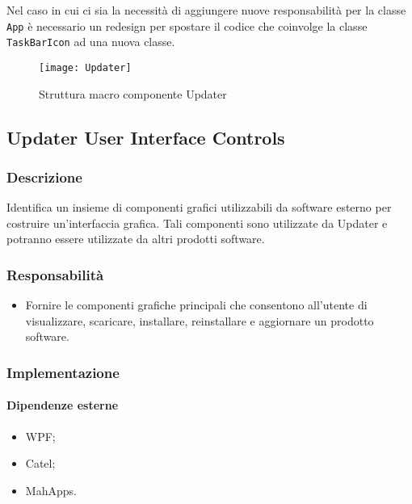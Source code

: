 \documentclass[../RelazioneFinale.tex]{subfiles}
\begin{document}
				Nel caso in cui ci sia la necessità di aggiungere nuove responsabilità per la classe \verb|App| è necessario un redesign per spostare il codice che coinvolge la classe \verb|TaskBarIcon| ad una nuova classe. 		
			\vfill
			\begin{figure}[h]
				\texttt{[image: Updater]}
				\label{fig:Updater}
				\caption{Struttura macro componente Updater}
			\end{figure}
				
\newpage
			
		\subsection{Updater User Interface Controls}

			\subsubsection{Descrizione}
				Identifica un insieme di componenti grafici utilizzabili da software esterno per costruire un'interfaccia grafica. Tali componenti sono utilizzate da Updater e potranno essere utilizzate da altri prodotti software.
				
			\subsubsection{Responsabilità}
			\begin{itemize}
				\item Fornire le componenti grafiche principali che consentono all'utente di visualizzare, scaricare, installare, reinstallare e aggiornare un prodotto software.
			\end{itemize}
			
			\subsubsection{Implementazione}
			
				\paragraph{Dipendenze esterne}
					\begin{itemize}
						\item WPF;
						\item Catel;
						\item MahApps.
					\end{itemize}
				
\end{document}
